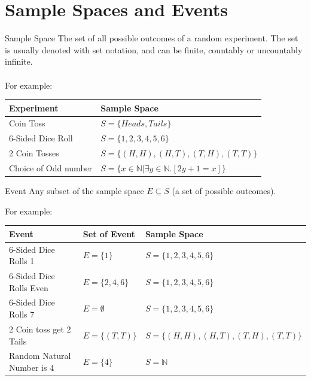 \section{Sample Spaces and Events}
\begin{definitionbox}{Sample Space}
	The set of all possible outcomes of a random experiment. The set is usually denoted with set notation, and can be finite, countably or uncountably infinite.
	\\
	\\ For example:
	\begin{center}
		\begin{tabular}{l l}
			\textbf{Experiment}  & \textbf{Sample Space}                                                \\
			\hline
			Coin Toss            & $S = \{Heads, Tails\}$                                               \\
			6-Sided Dice Roll    & $S = \{1,2,3,4,5,6\}$                                                \\
			2 Coin Tosses        & $S = \{(H,H), (H,T), (T,H), (T,T)\}$                                 \\
			Choice of Odd number & $S = \{ x \in \mathbb{N} | \exists y \in \mathbb{N}.[2y + 1 = x] \}$
		\end{tabular}
	\end{center}
\end{definitionbox}
\begin{definitionbox}{Event}
	Any subset of the sample space $E \subseteq S$ (a set of possible outcomes).
	\begin{itemize}
    \end{itemize}
    For example:
    \begin{center}
        \begin{tabular}{l l l}
            \textbf{Event}             & \textbf{Set of Event} & \textbf{Sample Space}                \\
            \hline
            6-Sided Dice Rolls 1       & $E = \{1\}$           & $S = \{1,2,3,4,5,6\}$                \\
            6-Sided Dice Rolls Even    & $E = \{2,4,6\}$       & $S = \{1,2,3,4,5,6\}$                \\
            6-Sided Dice Rolls 7       & $E = \emptyset$       & $S = \{1,2,3,4,5,6\}$                \\
			2 Coin toss get 2 Tails    & $E = \{(T,T)\}$       & $S = \{(H,H), (H,T), (T,H), (T,T)\}$ \\
			Random Natural Number is 4 & $E = \{4\}$           & $S = \mathbb{N}$                     \\
		\end{tabular}
	\end{center}
\end{definitionbox}
